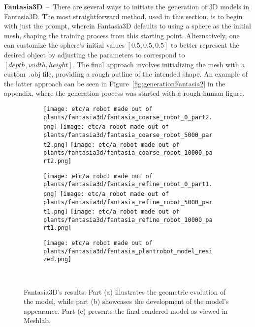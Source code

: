 \indent\textbf{Fantasia3D}~--~There are several ways to initiate the generation of 3D models in Fantasia3D. The most straightforward method, used in this section, is to begin with just the prompt, wherein Fantasia3D defaults to using a sphere as the initial mesh, shaping the training process from this starting point. Alternatively, one can customize the sphere's initial values  \([0.5, 0.5, 0.5]\) to better represent the desired object by adjusting the parameters to correspond to \([depth, width, height]\). The final approach involves initializing the mesh with a custom~.obj file, providing a rough outline of the intended shape. An example of the latter approach can be seen in Figure~\ref{fig:generationFantasia2} in the appendix, where the generation process was started with a rough human figure.

\begin{figure}[H]
    \centering
    \begin{subfigure}[b]{0.20\textwidth}
        \centering
        \fontsize{9pt}{7pt}\selectfont{}\vspace{3cm}
        \fontsize{9pt}{7pt}\selectfont{}\vspace{2.85cm}
        \fontsize{9pt}{7pt}\selectfont{}\vspace{1.95cm}
    \end{subfigure}
    \begin{subfigure}[b]{0.20\textwidth}
        \centering
        \texttt{[image: etc/a robot made out of plants/fantasia3d/fantasia\_coarse\_robot\_0\_part2.png]}
        \texttt{[image: etc/a robot made out of plants/fantasia3d/fantasia\_coarse\_robot\_5000\_part2.png]}
        \texttt{[image: etc/a robot made out of plants/fantasia3d/fantasia\_coarse\_robot\_10000\_part2.png]}
        \caption{}
    \end{subfigure}
    \begin{subfigure}[b]{0.20\textwidth}
        \centering
        \texttt{[image: etc/a robot made out of plants/fantasia3d/fantasia\_refine\_robot\_0\_part1.png]}
        \texttt{[image: etc/a robot made out of plants/fantasia3d/fantasia\_refine\_robot\_5000\_part1.png]}
        \texttt{[image: etc/a robot made out of plants/fantasia3d/fantasia\_refine\_robot\_10000\_part1.png]}
        \caption{}
    \end{subfigure}
    \begin{subfigure}[b]{0.37\textwidth}
        \centering
        \texttt{[image: etc/a robot made out of plants/fantasia3d/fantasia\_plantrobot\_model\_resized.png]}
        \caption{}
    \end{subfigure}
    \caption{Fantasia3D's results: Part (a) illustrates the geometric evolution of the model, while part (b) showcases the development of the model's appearance. Part (c) presents the final rendered model as viewed in Meshlab.}~\label{fig:generationFantasia}
\end{figure}

